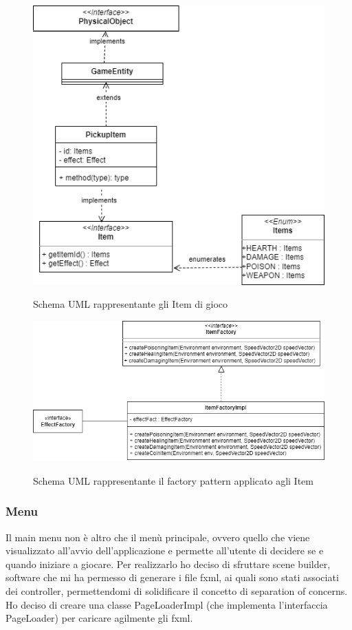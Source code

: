 \begin{figure}[H]
	\centering{}
	\includegraphics[width=\textwidth]{img/item}
	\label{img:item.png}
	\caption{Schema UML rappresentante gli Item di gioco\\}
\end{figure}

\begin{figure}[H]
	\centering{}
	\includegraphics[width=\textwidth]{img/ItemFactory}
	\label{img:ItemFactory.png}
	\caption{Schema UML rappresentante il factory pattern applicato agli Item\\}
\end{figure}

\newpage

\subsubsection{Menu}
Il main menu non è altro che il menù principale, ovvero quello che viene visualizzato all'avvio dell'applicazione e permette all'utente di decidere se e quando iniziare a giocare.
Per realizzarlo ho deciso di sfruttare scene builder, software che mi ha permesso di generare i file fxml, ai quali sono stati associati dei controller, permettendomi di solidificare il concetto di separation of concerns. Ho deciso di creare una classe PageLoaderImpl (che implementa l'interfaccia PageLoader) per caricare agilmente gli fxml.

